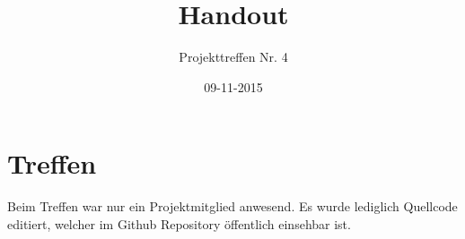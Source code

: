 \documentclass[a4paper,DIV=9,12pt]{scrreprt}
\begin{document}


\onehalfspace

\begin{titlepage}
    \title{Handout}
    \subtitle{Projekttreffen Nr. 4}
    \author{}
    \date{09-11-2015}
    \maketitle
    \thispagestyle{empty}
\end{titlepage}
\setcounter{page}{1}


\chapter{Treffen}

    Beim Treffen war nur ein Projektmitglied anwesend.
    Es wurde lediglich Quellcode editiert, welcher im Github Repository
    öffentlich einsehbar ist.
\end{document}
